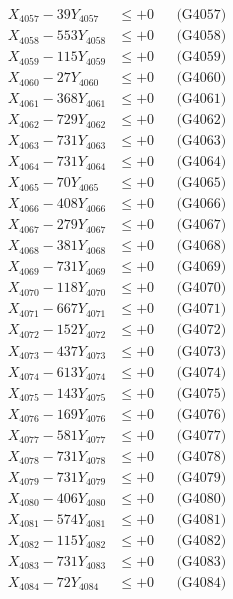 \documentclass[a4paper,10pt]{article}
\begin{document}
{\begin{align}
X_{4057} - 39Y_{4057} &\leq +0 && \text{(G4057)} \\
X_{4058} - 553Y_{4058} &\leq +0 && \text{(G4058)} \\
X_{4059} - 115Y_{4059} &\leq +0 && \text{(G4059)} \\
X_{4060} - 27Y_{4060} &\leq +0 && \text{(G4060)} \\
\allowbreak
X_{4061} - 368Y_{4061} &\leq +0 && \text{(G4061)} \\
X_{4062} - 729Y_{4062} &\leq +0 && \text{(G4062)} \\
X_{4063} - 731Y_{4063} &\leq +0 && \text{(G4063)} \\
X_{4064} - 731Y_{4064} &\leq +0 && \text{(G4064)} \\
X_{4065} - 70Y_{4065} &\leq +0 && \text{(G4065)} \\
X_{4066} - 408Y_{4066} &\leq +0 && \text{(G4066)} \\
X_{4067} - 279Y_{4067} &\leq +0 && \text{(G4067)} \\
X_{4068} - 381Y_{4068} &\leq +0 && \text{(G4068)} \\
X_{4069} - 731Y_{4069} &\leq +0 && \text{(G4069)} \\
X_{4070} - 118Y_{4070} &\leq +0 && \text{(G4070)} \\
\allowbreak
X_{4071} - 667Y_{4071} &\leq +0 && \text{(G4071)} \\
X_{4072} - 152Y_{4072} &\leq +0 && \text{(G4072)} \\
X_{4073} - 437Y_{4073} &\leq +0 && \text{(G4073)} \\
X_{4074} - 613Y_{4074} &\leq +0 && \text{(G4074)} \\
X_{4075} - 143Y_{4075} &\leq +0 && \text{(G4075)} \\
X_{4076} - 169Y_{4076} &\leq +0 && \text{(G4076)} \\
X_{4077} - 581Y_{4077} &\leq +0 && \text{(G4077)} \\
X_{4078} - 731Y_{4078} &\leq +0 && \text{(G4078)} \\
X_{4079} - 731Y_{4079} &\leq +0 && \text{(G4079)} \\
X_{4080} - 406Y_{4080} &\leq +0 && \text{(G4080)} \\
\allowbreak
X_{4081} - 574Y_{4081} &\leq +0 && \text{(G4081)} \\
X_{4082} - 115Y_{4082} &\leq +0 && \text{(G4082)} \\
X_{4083} - 731Y_{4083} &\leq +0 && \text{(G4083)} \\
X_{4084} - 72Y_{4084} &\leq +0 && \text{(G4084)} \\

\end{align}}
\end{document}
